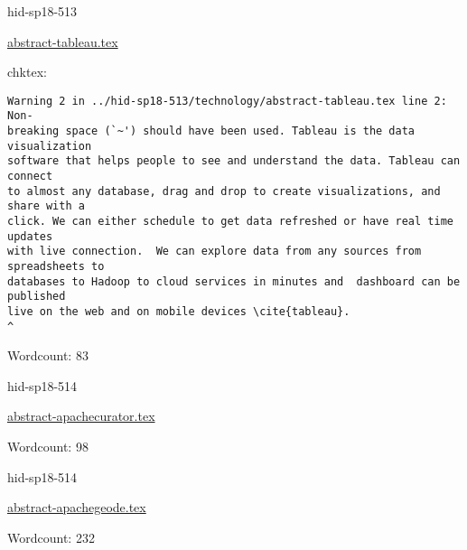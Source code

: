 

\begin{IU}

hid-sp18-513

\href{https://github.com/cloudmesh-community/hid-sp18-513/blob/master//technology/abstract-tableau.tex}{abstract-tableau.tex}

 
chktex:
\begin{tiny}
\begin{verbatim}
Warning 2 in ../hid-sp18-513/technology/abstract-tableau.tex line 2: Non-
breaking space (`~') should have been used. Tableau is the data visualization
software that helps people to see and understand the data. Tableau can connect
to almost any database, drag and drop to create visualizations, and share with a
click. We can either schedule to get data refreshed or have real time updates
with live connection.  We can explore data from any sources from spreadsheets to
databases to Hadoop to cloud services in minutes and  dashboard can be published
live on the web and on mobile devices \cite{tableau}.
^
\end{verbatim}
\end{tiny}

Wordcount: 83

\end{IU}



\begin{IU}

hid-sp18-514

\href{https://github.com/cloudmesh-community/hid-sp18-514/blob/master//technology/abstract-apachecurator.tex}{abstract-apachecurator.tex}

 

Wordcount: 98

\end{IU}



\begin{IU}

hid-sp18-514

\href{https://github.com/cloudmesh-community/hid-sp18-514/blob/master//technology/abstract-apachegeode.tex}{abstract-apachegeode.tex}

 

Wordcount: 232

\end{IU}

